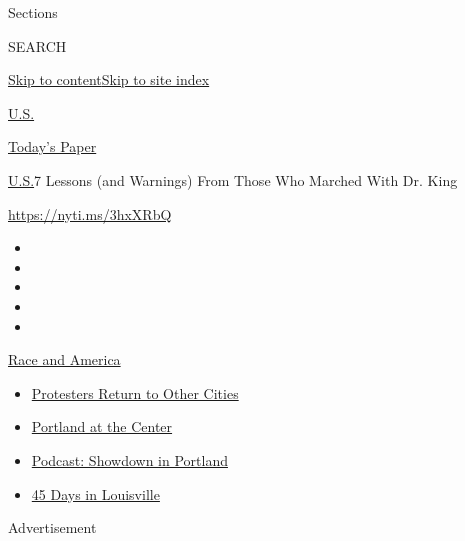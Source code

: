 Sections

SEARCH

\protect\hyperlink{site-content}{Skip to
content}\protect\hyperlink{site-index}{Skip to site index}

\href{https://www.nytimes.com/section/us}{U.S.}

\href{https://myaccount.nytimes.com/auth/login?response_type=cookie\&client_id=vi}{}

\href{https://www.nytimes.com/section/todayspaper}{Today's Paper}

\href{/section/us}{U.S.}\textbar{}7 Lessons (and Warnings) From Those
Who Marched With Dr. King

\url{https://nyti.ms/3hxXRbQ}

\begin{itemize}
\item
\item
\item
\item
\item
\end{itemize}

\href{https://www.nytimes.com/news-event/george-floyd-protests-minneapolis-new-york-los-angeles?action=click\&pgtype=Article\&state=default\&region=TOP_BANNER\&context=storylines_menu}{Race
and America}

\begin{itemize}
\tightlist
\item
  \href{https://www.nytimes.com/2020/07/26/us/protests-portland-seattle-trump.html?action=click\&pgtype=Article\&state=default\&region=TOP_BANNER\&context=storylines_menu}{Protesters
  Return to Other Cities}
\item
  \href{https://www.nytimes.com/2020/07/24/us/portland-oregon-protests-white-race.html?action=click\&pgtype=Article\&state=default\&region=TOP_BANNER\&context=storylines_menu}{Portland
  at the Center}
\item
  \href{https://www.nytimes.com/2020/07/23/podcasts/the-daily/portland-protests.html?action=click\&pgtype=Article\&state=default\&region=TOP_BANNER\&context=storylines_menu}{Podcast:
  Showdown in Portland}
\item
  \href{https://www.nytimes.com/interactive/2020/07/16/us/black-lives-matter-protests-louisville-breonna-taylor.html?action=click\&pgtype=Article\&state=default\&region=TOP_BANNER\&context=storylines_menu}{45
  Days in Louisville}
\end{itemize}

Advertisement


